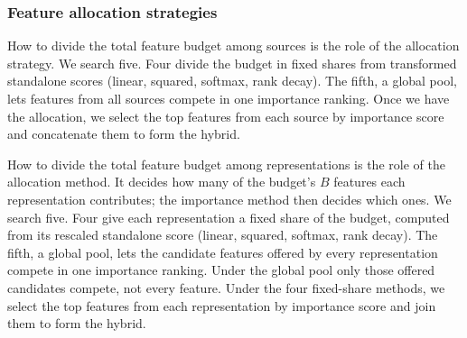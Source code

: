 \subsubsection{Feature allocation strategies}

How to divide the total feature budget among sources is the role of the allocation strategy. We search five. Four divide the budget in fixed shares from transformed standalone scores (linear, squared, softmax, rank decay). The fifth, a global pool, lets features from all sources compete in one importance ranking. Once we have the allocation, we select the top features from each source by importance score and concatenate them to form the hybrid.

How to divide the total feature budget among representations is the role of the allocation method. It decides how many of the budget's $B$ features each representation contributes; the importance method then decides which ones. We search five. Four give each representation a fixed share of the budget, computed from its rescaled standalone score (linear, squared, softmax, rank decay). The fifth, a global pool, lets the candidate features offered by every representation compete in one importance ranking. Under the global pool only those offered candidates compete, not every feature. Under the four fixed-share methods, we select the top features from each representation by importance score and join them to form the hybrid.





